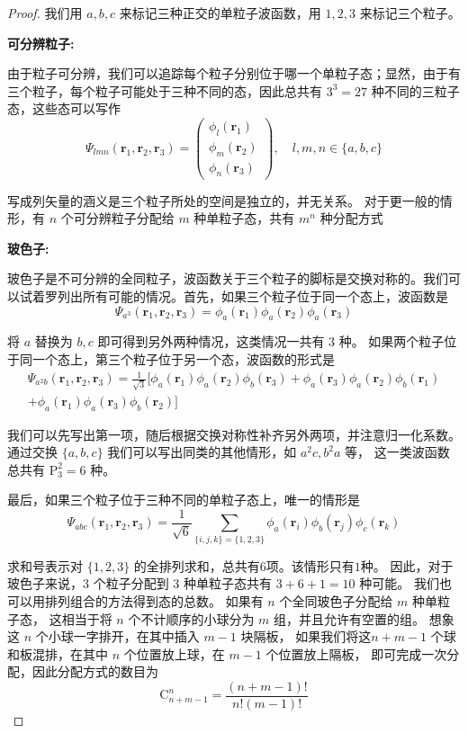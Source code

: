 \begin{proof}
我们用 $a, b, c$ 来标记三种正交的单粒子波函数，用 $1,2,3$ 来标记三个粒子。

\textbf{可分辨粒子:}

由于粒子可分辨，我们可以追踪每个粒子分别位于哪一个单粒子态；显然，由于有三个粒子，每个粒子可能处于三种不同的态，因此总共有 $3^{3}=27$ 种不同的三粒子态，这些态可以写作
$$\Psi_{l m n}(\mathbf{r}_{1}, \mathbf{r}_{2}, \mathbf{r}_{3})
=\begin{pmatrix}
\phi_{l}(\mathbf{r}_{1}) \\
\phi_{m}(\mathbf{r}_{2}) \\
\phi_{n}(\mathbf{r}_{3})
\end{pmatrix}, \quad l, m, n \in \{a, b, c\}$$

写成列矢量的涵义是三个粒子所处的空间是独立的，并无关系。
对于更一般的情形，有 $n$ 个可分辨粒子分配给 $m$ 种单粒子态，共有 $m^{n}$ 种分配方式

\textbf{玻色子:}

玻色子是不可分辨的全同粒子，波函数关于三个粒子的脚标是交换对称的。我们可以试着罗列出所有可能的情况。首先，如果三个粒子位于同一个态上，波函数是
$$\Psi_{a^{3}}(\mathbf{r}_{1}, \mathbf{r}_{2}, \mathbf{r}_{3})
=\phi_{a}(\mathbf{r}_{1}) \phi_{a}(\mathbf{r}_{2}) \phi_{a}(\mathbf{r}_{3})$$

将 $a$ 替换为 $b, c$ 即可得到另外两种情况，这类情况一共有 $3$ 种。
如果两个粒子位于同一个态上，第三个粒子位于另一个态，波函数的形式是
$$
\begin{gathered}
\Psi_{a^{2} b}(\mathbf{r}_{1}, \mathbf{r}_{2}, \mathbf{r}_{3})
=\frac{1}{\sqrt{3}}\big[\phi_{a}(\mathbf{r}_{1}) \phi_{a}(\mathbf{r}_{2}) \phi_{b}(\mathbf{r}_{3})
+\phi_{a}(\mathbf{r}_{3}) \phi_{a}(\mathbf{r}_{2}) \phi_{b}(\mathbf{r}_{1}) \\
+\phi_{a}(\mathbf{r}_{1}) \phi_{a}(\mathbf{r}_{3}) \phi_{b}(\mathbf{r}_{2})\big]
\end{gathered}
$$

我们可以先写出第一项，随后根据交换对称性补齐另外两项，并注意归一化系数。
通过交换 $\{a, b, c\}$ 我们可以写出同类的其他情形，如 $a^{2} c, b^{2} a$ 等，
这一类波函数总共有 $\mathrm{P}_{3}^{2}=6$ 种。

最后，如果三个粒子位于三种不同的单粒子态上，唯一的情形是
$$\Psi_{a b c}(\mathbf{r}_{1}, \mathbf{r}_{2}, \mathbf{r}_{3})
=\frac{1}{\sqrt{6}} \sum_{\{i, j, k\}=\{1,2,3\}} \phi_{a}(\mathbf{r}_{i}) \phi_{b}(\mathbf{r}_{j}) \phi_{c}(\mathbf{r}_{k})$$

求和号表示对 $\{1,2,3\}$ 的全排列求和，总共有$6$项。该情形只有$1$种。
因此，对于玻色子来说，$3$ 个粒子分配到 $3$ 种单粒子态共有 $3+6+1=10$ 种可能。
我们也可以用排列组合的方法得到态的总数。
如果有 $n$ 个全同玻色子分配给 $m$ 种单粒子态，
这相当于将 $n$ 个不计顺序的小球分为 $m$ 组，并且允许有空置的组。
想象这 $n$ 个小球一字排开，在其中插入 $m-1$ 块隔板，
如果我们将这$n+m-1$ 个球和板混排，在其中 $n$ 个位置放上球，在 $m-1$ 个位置放上隔板，
即可完成一次分配，因此分配方式的数目为
$$\mathrm{C}_{n+m-1}^{n}=\frac{(n+m-1)!}{n!(m-1)!}$$


\end{proof}
